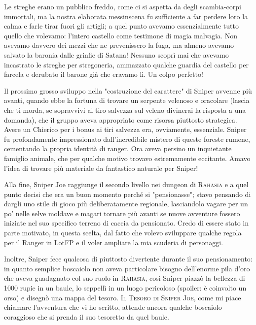 Le streghe erano un pubblico freddo, come ci si aspetta da degli scambia-corpi immortali, ma la nostra elaborata messinscena fu sufficiente a far perdere loro la calma e farle tirar fuori gli artigli; a quel punto avevamo essenzialmente tutto quello che volevamo: l'intero castello come testimone di magia malvagia. Non avevamo davvero dei mezzi che ne prevenissero la fuga, ma almeno avevamo salvato la baronia dalle grinfie di Satana! Nessuno scoprì mai che avevamo incastrato le streghe per stregoneria, ammazzato qualche guardia del castello per farcela e derubato il barone già che eravamo lì. Un colpo perfetto!

Il prossimo grosso sviluppo nella "costruzione del carattere" di Sniper avvenne più avanti, quando ebbe la fortuna di trovare un serpente velenoso e oracolare (lascia che ti morda, se sopravvivi al tiro salvezza sul veleno divinerai la risposta a una domanda), che il gruppo aveva appropriato come risorsa piuttosto strategica. Avere un Chierico per i bonus ai tiri salvezza era, ovviamente, essenziale. Sniper fu profondamente impressionato dall'incredibile mistero di queste foreste rumene, cementando la propria identità di ranger. Ora aveva persino un inquietante famiglio animale, che per qualche motivo trovavo estremamente eccitante. Amavo l'idea di trovare più materiale da fantastico naturale per Sniper!

Alla fine, Sniper Joe raggiunge il secondo livello nei dungeon di \textsc{Rahasia} e a quel punto decisi che era un buon momento perché si "pensionasse"; stavo pensando di dargli uno stile di gioco più deliberatamente regionale, lasciandolo vagare per un po' nelle selve moldave e magari tornare più avanti se nuove avventure fossero iniziate nel suo specifico terreno di caccia da pensionato. Credo di essere stato in parte motivato, in questa scelta, dal fatto che volevo sviluppare qualche regola per il Ranger in LotFP e il voler ampliare la mia scuderia di personaggi.

Inoltre, Sniper fece qualcosa di piuttosto divertente durante il suo pensionamento: in quanto semplice boscaiolo non aveva particolare bisogno dell'enorme pila d'oro che aveva guadagnato col suo ruolo in \textsc{Rahasia}, così Sniper piazzò la bellezza di 1000 rupie in un baule, lo seppellì in un luogo pericoloso (spoiler: è coinvolto un orso) e disegnò una mappa del tesoro. \textsc{Il Tesoro di Sniper Joe}, come mi piace chiamare l'avventura che vi ho scritto, attende ancora qualche boscaiolo coraggioso che si prenda il suo tesoretto da quel baule.

